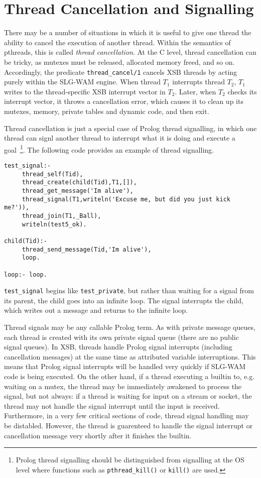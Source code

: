 \section{Thread Cancellation and Signalling}
%
There may be a number of situations in which it is useful to give one
thread the ability to cancel the execution of another thread.  Within
the semantics of pthreads, this is called {\em thread cancellation}.
At the C level, thread cancellation can be tricky, as mutexes must be
released, allocated memory freed, and so on.  Accordingly, the
predicate {\tt thread\_cancel/1} cancels XSB threads by acting purely
within the SLG-WAM engine.  When thread $T_1$ interrupts thread $T_2$,
$T_1$ writes to the thread-specific XSB interrupt vector in $T_2$.
Later, when $T_2$ checks its interrupt vector, it throws a
cancellation error, which causes it to clean up its mutexes, memory,
private tables and dynamic code, and then exit.

Thread cancellation is just a special case of Prolog thread
signalling, in which one thread can signl another thread to interrupt
what it is doing and execute a goal~\footnote{Prolog thread signalling
  should be distinguished from signalling at the OS level where
  functions such as {\tt pthread\_kill()} or {\tt kill()} are used.}.  The
following code provides an example of thread signalling.
%
\begin{verbatim}
test_signal:- 
     thread_self(Tid),
     thread_create(child(Tid),T1,[]),
     thread_get_message('Im alive'),
     thread_signal(T1,writeln('Excuse me, but did you just kick me?')),
     thread_join(T1,_Ball),
     writeln(test5_ok).

child(Tid):- 
     thread_send_message(Tid,'Im alive'),
     loop.

loop:- loop.
\end{verbatim}
%
{\tt test\_signal} begins like {\tt test\_private}, but rather than
waiting for a signal from its parent, the child goes into an infinite
loop.  The signal interrupts the child, which writes out a message and
returns to the infinite loop.

Thread signals may be any callable Prolog term.  As with private
message queues, each thread is created with its own private signal
queue (there are no public signal queues).  In XSB, threads handle
Prolog signal interrupts (including cancellation messages) at the same
time as attributed variable interruptions.  This means that Prolog
signal interrupts will be handled very quickly if SLG-WAM code is
being executed.  On the other hand, if a thread executing a builtin
to, e.g. waiting on a mutex, the thread may be immediately awakened to
process the signal, but not always: if a thread is waiting for input
on a stream or socket, the thread may not handle the signal interrupt
until the input is received.  Furthermore, in a very few critical
sections of code, thread signal handling may be distabled.  However,
the thread is guarenteed to handle the signal interrupt or
cancellation message very shortly after it finishes the builtin.

